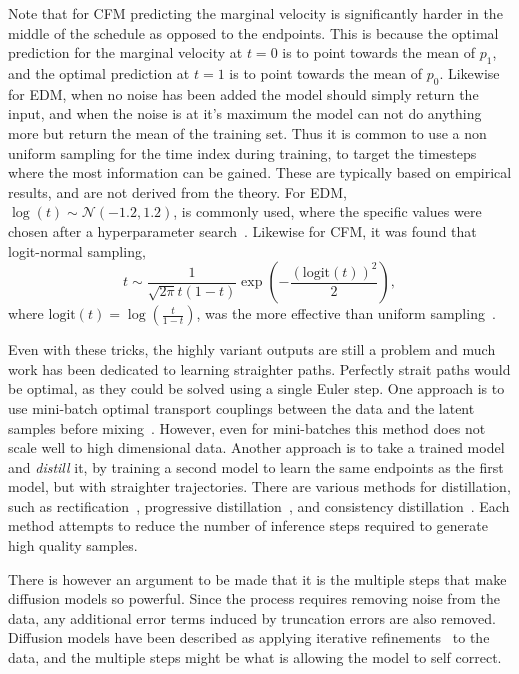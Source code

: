 Note that for CFM predicting the marginal velocity is significantly harder in the middle of the schedule as opposed to the endpoints.
This is because the optimal prediction for the marginal velocity at $t=0$ is to point towards the mean of $p_1$, and the optimal prediction at $t=1$ is to point towards the mean of $p_0$.
Likewise for EDM, when no noise has been added the model should simply return the input, and when the noise is at it's maximum the model can not do anything more but return the mean of the training set.
Thus it is common to use a non uniform sampling for the time index during training, to target the timesteps where the most information can be gained.
These are typically based on empirical results, and are not derived from the theory.
For EDM, $\log(t) \sim \mathcal{N}(-1.2, 1.2)$, is commonly used, where the specific values were chosen after a hyperparameter search~\cite{ElucidatingDesignSpace}.
Likewise for CFM, it was found that logit-normal sampling,
\begin{equation}
    t \sim \frac{1}{\sqrt{2\pi}t(1-t)}\exp\left(-\frac{(\text{logit}(t))^2}{2}\right),
\end{equation}
where $\text{logit}(t) = \log\left(\frac{t}{1-t}\right)$, was the more effective than uniform sampling~\cite{SD3}.

Even with these tricks, the highly variant outputs are still a problem and much work has been dedicated to learning straighter paths.
Perfectly strait paths would be optimal, as they could be solved using a single Euler step.
One approach is to use mini-batch optimal transport couplings between the data and the latent samples before mixing~\cite{ImprovingGeneralizingFlowbased}.
However, even for mini-batches this method does not scale well to high dimensional data.
Another approach is to take a trained model and \textit{distill} it, by training a second model to learn the same endpoints as the first model, but with straighter trajectories.
There are various methods for distillation, such as rectification~\cite{FlowStraightFast}, progressive distillation~\cite{ProgressiveDistillationFast}, and consistency distillation~\cite{ConsistencyModels}.
Each method attempts to reduce the number of inference steps required to generate high quality samples.

There is however an argument to be made that it is the multiple steps that make diffusion models so powerful.
Since the process requires removing noise from the data, any additional error terms induced by truncation errors are also removed.
Diffusion models have been described as applying iterative refinements~\cite{ImageSuperResolutionIterative} to the data, and the multiple steps might be what is allowing the model to self correct.

